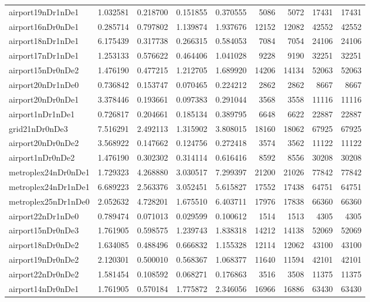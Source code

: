 \begin{longtable}{|l|r|r|r|r|r|r|r|r|}
airport19nDr1nDe1 & 1.032581 & 0.218700 & 0.151855 & 0.370555 & 5086 & 5072 & 17431 & 17431 \\
airport16nDr0nDe1 & 0.285714 & 0.797802 & 1.139874 & 1.937676 & 12152 & 12082 & 42552 & 42552 \\
airport18nDr1nDe1 & 6.175439 & 0.317738 & 0.266315 & 0.584053 & 7084 & 7054 & 24106 & 24106 \\
airport17nDr1nDe1 & 1.253133 & 0.576622 & 0.464406 & 1.041028 & 9228 & 9190 & 32251 & 32251 \\
airport15nDr0nDe2 & 1.476190 & 0.477215 & 1.212705 & 1.689920 & 14206 & 14134 & 52063 & 52063 \\
airport20nDr1nDe0 & 0.736842 & 0.153747 & 0.070465 & 0.224212 & 2862 & 2862 & 8667 & 8667 \\
airport20nDr0nDe1 & 3.378446 & 0.193661 & 0.097383 & 0.291044 & 3568 & 3558 & 11116 & 11116 \\
airport1nDr1nDe1 & 0.726817 & 0.204661 & 0.185134 & 0.389795 & 6648 & 6622 & 22887 & 22887 \\
grid21nDr0nDe3 & 7.516291 & 2.492113 & 1.315902 & 3.808015 & 18160 & 18062 & 67925 & 67925 \\
airport20nDr0nDe2 & 3.568922 & 0.147662 & 0.124756 & 0.272418 & 3574 & 3562 & 11122 & 11122 \\
airport1nDr0nDe2 & 1.476190 & 0.302302 & 0.314114 & 0.616416 & 8592 & 8556 & 30208 & 30208 \\
metroplex24nDr0nDe1 & 1.729323 & 4.268880 & 3.030517 & 7.299397 & 21200 & 21026 & 77842 & 77842 \\
metroplex24nDr1nDe1 & 6.689223 & 2.563376 & 3.052451 & 5.615827 & 17552 & 17438 & 64751 & 64751 \\
metroplex25nDr1nDe0 & 2.052632 & 4.728201 & 1.675510 & 6.403711 & 17976 & 17838 & 66360 & 66360 \\
airport22nDr1nDe0 & 0.789474 & 0.071013 & 0.029599 & 0.100612 & 1514 & 1513 & 4305 & 4305 \\
airport15nDr0nDe3 & 1.761905 & 0.598575 & 1.239743 & 1.838318 & 14212 & 14138 & 52069 & 52069 \\
airport18nDr0nDe2 & 1.634085 & 0.488496 & 0.666832 & 1.155328 & 12114 & 12062 & 43100 & 43100 \\
airport19nDr0nDe2 & 2.120301 & 0.500010 & 0.568367 & 1.068377 & 11640 & 11594 & 42101 & 42101 \\
airport22nDr0nDe2 & 1.581454 & 0.108592 & 0.068271 & 0.176863 & 3516 & 3508 & 11375 & 11375 \\
airport14nDr0nDe1 & 1.761905 & 0.570184 & 1.775872 & 2.346056 & 16966 & 16886 & 63430 & 63430 \\

\end{longtable}
